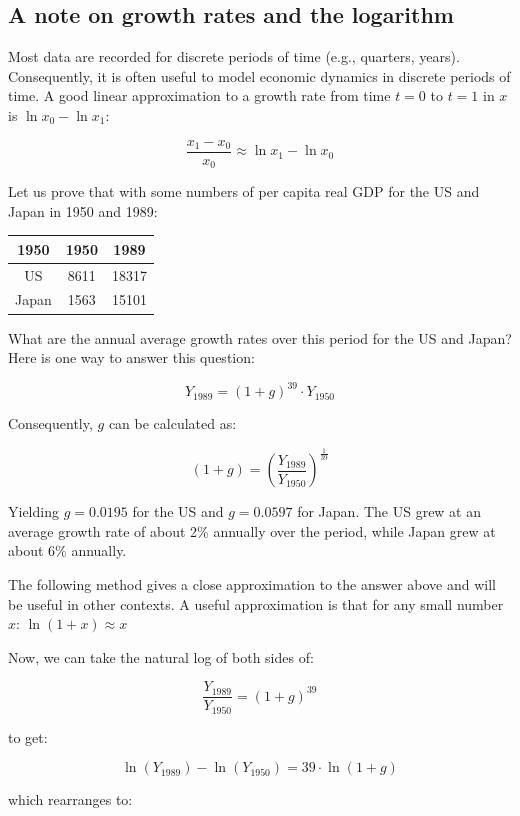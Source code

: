 \documentclass[
  12pt,
  oneside]{book}
\theoremstyle{definition}
\theoremstyle{definition}
\theoremstyle{definition}
\theoremstyle{definition}
\theoremstyle{remark}
\begin{document}
\subsection{A note on growth rates and the logarithm}\label{a-note-on-growth-rates-and-the-logarithm}

Most data are recorded for discrete periods of time (e.g., quarters, years). Consequently, it is often useful to model economic dynamics in discrete periods of time. A good linear approximation to a growth rate from time \(t=0\) to \(t=1\) in \(x\) is \(\ln x_0 - \ln x_1\):

\[
\frac{x_1 - x_0}{x_0} \approx \ln x_1 - \ln x_0
\]

Let us prove that with some numbers of per capita real GDP for the US and Japan in 1950 and 1989:

\begin{center}
    \begin{tabular}{ccc}\toprule
        1950 & 1950 & 1989 \\ \midrule
        US & 8611 & 18317 \\ 
        Japan & 1563 & 15101 \\ \bottomrule
    \end{tabular} 
\end{center}

What are the annual average growth rates over this period for the US and Japan? Here is one way to answer this question:

\[
Y_{1989} = (1 + g)^{39} \cdot Y_{1950}
\]

Consequently, \(g\) can be calculated as:

\[
(1 + g) = \left(\frac{Y_{1989}}{Y_{1950}}\right)^{\frac{1}{39}}
\]

Yielding \(g = 0.0195\) for the US and \(g = 0.0597\) for Japan. The US grew at an average growth rate of about 2\% annually over the period, while Japan grew at about 6\% annually.

The following method gives a close approximation to the answer above and will be useful in other contexts. A useful approximation is that for any small number \(x\): \(\ln (1 + x) \approx x\)

Now, we can take the natural log of both sides of:

\[
\frac{Y_{1989}}{Y_{1950}} = (1 + g)^{39}
\]

to get:

\[
\ln (Y_{1989}) - \ln (Y_{1950}) = 39 \cdot \ln (1 + g)
\]

which rearranges to:
\end{document}
